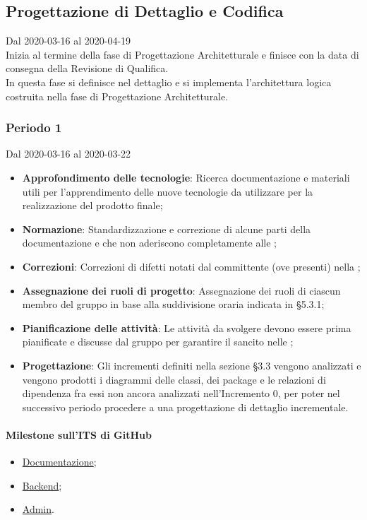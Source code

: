 \subsection{Progettazione di Dettaglio e Codifica}
Dal 2020-03-16 al 2020-04-19\\
Inizia al termine della fase di Progettazione Architetturale e finisce con la data di consegna della Revisione di Qualifica.\\
In questa fase si definisce nel dettaglio e si implementa l'architettura logica costruita nella fase di Progettazione Architetturale.

\subsubsection{Periodo 1} 
Dal 2020-03-16 al 2020-03-22
\begin{itemize}
	\item \textbf{Approfondimento delle tecnologie}: Ricerca documentazione e materiali utili per l'apprendimento delle nuove tecnologie da utilizzare per la realizzazione del prodotto finale;
	\item \textbf{Normazione}: Standardizzazione e correzione di alcune parti della documentazione e che non aderiscono completamente alle \NdP{};
	\item \textbf{Correzioni}: Correzioni di difetti notati dal committente (ove presenti) nella ;
	\item \textbf{Assegnazione dei ruoli di progetto}: Assegnazione dei ruoli di ciascun membro del gruppo in base alla suddivisione oraria indicata in §5.3.1;
	\item \textbf{Pianificazione delle attività}: Le attività da svolgere devono essere prima pianificate e discusse dal gruppo per garantire il  sancito nelle \NdP{};
	\item \textbf{Progettazione}: Gli incrementi definiti nella sezione §3.3 vengono analizzati e vengono prodotti i diagrammi delle classi, dei package e le relazioni di dipendenza fra essi non ancora analizzati nell'Incremento 0, per poter nel successivo periodo procedere a una progettazione di dettaglio incrementale.
\end{itemize}
\paragraph{Milestone sull'ITS di GitHub}
\begin{itemize}
	\item \href{https://github.com/qb-team/Stalker-Documentazione/milestone/11}{Documentazione};
	\item \href{https://github.com/qb-team/Stalker-Backend/milestone/1}{Backend};
	\item \href{https://github.com/qb-team/Stalker-Admin/milestone/1}{Admin}.
\end{itemize}

